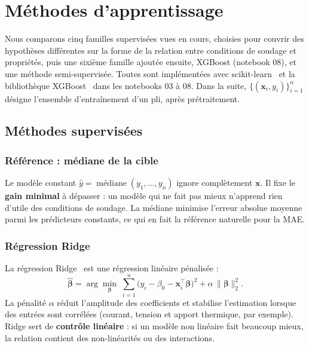 \clearpage
\section{Méthodes d'apprentissage}
\label{sec:methodes}

Nous comparons cinq familles supervisées vues en cours, choisies pour couvrir des
hypothèses différentes sur la forme de la relation entre conditions de soudage et
propriétés, puis une sixième famille ajoutée ensuite, XGBoost (notebook 08), et une
méthode semi-supervisée. Toutes sont implémentées avec
scikit-learn~\cite{pedregosa_2011} et la bibliothèque XGBoost~\cite{chen_guestrin_2016}
dans les notebooks 03 à 08. Dans la suite,
$\{(\bm{x}_i, y_i)\}_{i=1}^{n}$ désigne l'ensemble d'entraînement d'un pli, après
prétraitement.

\subsection{Méthodes supervisées}

\subsubsection{Référence : médiane de la cible}
Le modèle constant $\hat{y} = \operatorname{médiane}(y_1,\dots,y_n)$ ignore
complètement $\bm{x}$. Il fixe le \textbf{gain minimal} à dépasser : un modèle qui
ne fait pas mieux n'apprend rien d'utile des conditions de soudage. La médiane
minimise l'erreur absolue moyenne parmi les prédicteurs constants, ce qui en fait
la référence naturelle pour la MAE.

\subsubsection{Régression Ridge}
La régression Ridge~\cite{hoerl_1970} est une régression linéaire pénalisée :
\begin{equation}
  \hat{\bm{\beta}} = \arg\min_{\bm{\beta}}\; \sum_{i=1}^{n}\bigl(y_i - \beta_0 - \bm{x}_i^{\top}\bm{\beta}\bigr)^2 + \alpha\,\lVert\bm{\beta}\rVert_2^2 .
\end{equation}
La pénalité $\alpha$ réduit l'amplitude des coefficients et stabilise
l'estimation lorsque des entrées sont corrélées (courant, tension et apport
thermique, par exemple). Ridge sert de \textbf{contrôle linéaire} : si un modèle
non linéaire fait beaucoup mieux, la relation contient des non-linéarités ou des
interactions.

